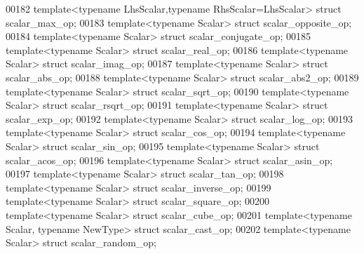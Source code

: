 \begin{DoxyCode}
00182 \textcolor{keyword}{template}<\textcolor{keyword}{typename} LhsScalar,\textcolor{keyword}{typename} RhsScalar=LhsScalar> \textcolor{keyword}{struct }scalar\_max\_op;
00183 \textcolor{keyword}{template}<\textcolor{keyword}{typename} Scalar> \textcolor{keyword}{struct }scalar\_opposite\_op;
00184 \textcolor{keyword}{template}<\textcolor{keyword}{typename} Scalar> \textcolor{keyword}{struct }scalar\_conjugate\_op;
00185 \textcolor{keyword}{template}<\textcolor{keyword}{typename} Scalar> \textcolor{keyword}{struct }scalar\_real\_op;
00186 \textcolor{keyword}{template}<\textcolor{keyword}{typename} Scalar> \textcolor{keyword}{struct }scalar\_imag\_op;
00187 \textcolor{keyword}{template}<\textcolor{keyword}{typename} Scalar> \textcolor{keyword}{struct }scalar\_abs\_op;
00188 \textcolor{keyword}{template}<\textcolor{keyword}{typename} Scalar> \textcolor{keyword}{struct }scalar\_abs2\_op;
00189 \textcolor{keyword}{template}<\textcolor{keyword}{typename} Scalar> \textcolor{keyword}{struct }scalar\_sqrt\_op;
00190 \textcolor{keyword}{template}<\textcolor{keyword}{typename} Scalar> \textcolor{keyword}{struct }scalar\_rsqrt\_op;
00191 \textcolor{keyword}{template}<\textcolor{keyword}{typename} Scalar> \textcolor{keyword}{struct }scalar\_exp\_op;
00192 \textcolor{keyword}{template}<\textcolor{keyword}{typename} Scalar> \textcolor{keyword}{struct }scalar\_log\_op;
00193 \textcolor{keyword}{template}<\textcolor{keyword}{typename} Scalar> \textcolor{keyword}{struct }scalar\_cos\_op;
00194 \textcolor{keyword}{template}<\textcolor{keyword}{typename} Scalar> \textcolor{keyword}{struct }scalar\_sin\_op;
00195 \textcolor{keyword}{template}<\textcolor{keyword}{typename} Scalar> \textcolor{keyword}{struct }scalar\_acos\_op;
00196 \textcolor{keyword}{template}<\textcolor{keyword}{typename} Scalar> \textcolor{keyword}{struct }scalar\_asin\_op;
00197 \textcolor{keyword}{template}<\textcolor{keyword}{typename} Scalar> \textcolor{keyword}{struct }scalar\_tan\_op;
00198 \textcolor{keyword}{template}<\textcolor{keyword}{typename} Scalar> \textcolor{keyword}{struct }scalar\_inverse\_op;
00199 \textcolor{keyword}{template}<\textcolor{keyword}{typename} Scalar> \textcolor{keyword}{struct }scalar\_square\_op;
00200 \textcolor{keyword}{template}<\textcolor{keyword}{typename} Scalar> \textcolor{keyword}{struct }scalar\_cube\_op;
00201 \textcolor{keyword}{template}<\textcolor{keyword}{typename} Scalar, \textcolor{keyword}{typename} NewType> \textcolor{keyword}{struct }scalar\_cast\_op;
00202 \textcolor{keyword}{template}<\textcolor{keyword}{typename} Scalar> \textcolor{keyword}{struct }scalar\_random\_op;

\end{DoxyCode}
